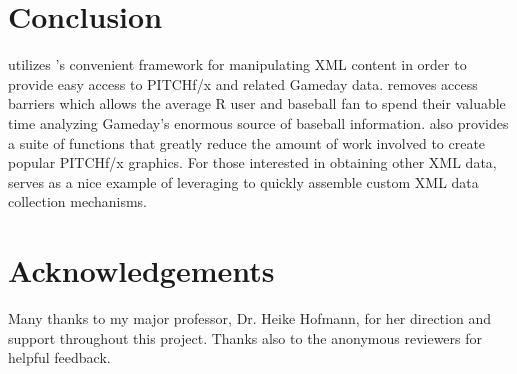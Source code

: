 \begin{article}
\section{Conclusion}

 utilizes 's convenient framework for manipulating
XML content in order to provide easy access to PITCHf/x and related
Gameday data.  removes access barriers which allows
the average R user and baseball fan to spend their valuable time analyzing
Gameday's enormous source of baseball information. 
also provides a suite of functions that greatly reduce the amount
of work involved to create popular PITCHf/x graphics. For those interested
in obtaining other XML data,  serves as a nice example
of leveraging  to quickly assemble custom XML data collection
mechanisms.

\section{Acknowledgements}

Many thanks to my major professor, Dr. Heike Hofmann, for her direction
and support throughout this project. Thanks also to the anonymous
reviewers for helpful feedback.





\address{Carson Sievert\\
Department of Statistics\\
Iowa State University}\\

\end{article}
